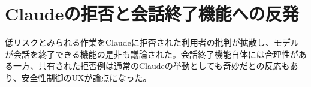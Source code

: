 \section{Claudeの拒否と会話終了機能への反発}
低リスクとみられる作業をClaudeに拒否された利用者の批判が拡散し、モデルが会話を終了できる機能の是非も議論された。会話終了機能自体には合理性がある一方、共有された拒否例は通常のClaudeの挙動としても奇妙だとの反応もあり、安全性制御のUXが論点になった。
